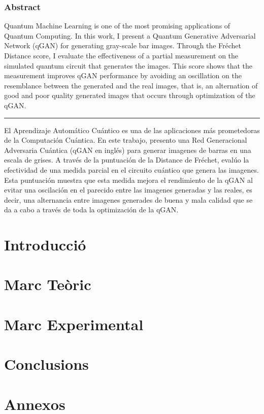\documentclass[a4paper,12pt,arial,numbered,print,oneside]{book}
\newcommand\blankpage{%
	\null
	\thispagestyle{empty}%
	\addtocounter{page}{-1}%
	\newpage}
\begin{document}
	\afterpage{\blankpage}

	\tableofcontents
	
	\afterpage{\blankpage}
	
	\section*{Abstract}
	\tab Quantum Machine Learning is one of the most promising applications of Quantum Computing. In this work, I present a Quantum Generative Adversarial Network (qGAN) for generating gray-scale bar images. Through the Fréchet Distance score, I evaluate the effectiveness of a partial measurement on the simulated quantum circuit that generates the images. This score shows that the measurement improves qGAN performance by avoiding an oscillation on the resemblance between the generated and the real images, that is, an alternation of good and poor quality generated images that occurs through optimization of the qGAN. 
	
	\vspace{1cm}
	\hrule
	\vspace{1cm}

	El Aprendizaje Automático Cuántico es una de las aplicaciones más prometedoras de la Computación Cuántica. En este trabajo, presento una Red Generacional Adversaria Cuántica (qGAN en inglés) para generar imagenes de barras en una escala de grises. A través de la puntuación de la Distance de Fréchet, evalúo la efectividad de una medida parcial en el circuito cuántico que genera las imagenes. Esta puntuación muestra que esta medida mejora el rendimiento de la qGAN al evitar una oscilación en el parecido entre las imagenes generadas y las reales, es decir, una alternancia entre imagenes generades de buena y mala calidad que se da a cabo a través de toda la optimización de la qGAN.
	
	\clearpage
	
	
	\afterpage{\blankpage}
	
	\part{Introducció}
	\label{part:intro}
	
	
	\part{Marc Teòric}
	\label{part:theoretical_framework}
	
	
	\part{Marc Experimental}
	\label{part:experimental_work}
	
	
	\part{Conclusions}
	\label{part:conclusions}
	

	\setcounter{chapter}{0}
	\renewcommand{\thechapter}{\Alph{chapter}}
	\part{Annexos}
	\label{part:appendices}
	

	\typeout{}
	
	
	
	
\end{document}
